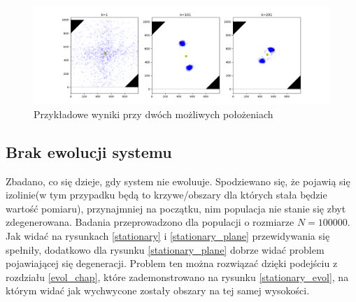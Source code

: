 \begin{figure}[H]
	\begin{center}
		\includegraphics[width=15cm]{./one_pivot.png}
		\caption{Przykładowe wyniki przy dwóch możliwych położeniach}
		\label{one_pivot}
	\end{center}
\end{figure}

\subsection{Brak ewolucji systemu}
Zbadano, co się dzieje, gdy system nie ewoluuje. Spodziewano się, że pojawią się izolinie(w tym przypadku będą to krzywe/obszary dla których stała będzie wartość pomiaru), przynajmniej na początku, nim populacja nie stanie się zbyt zdegenerowana. Badania przeprowadzono dla populacji o rozmiarze $N=100000$. Jak widać na rysunkach \ref{stationary} i \ref{stationary_plane} przewidywania się spełniły, dodatkowo dla rysunku \ref{stationary_plane} dobrze widać problem pojawiającej się degeneracji. Problem ten można rozwiązać dzięki podejściu z rozdziału \ref{evol_chap}, które zademonstrowano na rysunku \ref{stationary_evol}, na którym widać jak wychwycone zostały obszary na tej samej wysokości.

